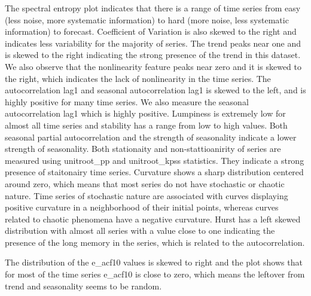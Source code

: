 \documentclass[preprint, 3p,
authoryear]{elsarticle} %
\begin{document}
The spectral entropy plot indicates that there is a range of time series
from easy (less noise, more systematic information) to hard (more noise,
less systematic information) to forecast. Coefficient of Variation is
also skewed to the right and indicates less variability for the majority
of series. The trend peaks near one and is skewed to the right
indicating the strong presence of the trend in this dataset. We also
observe that the nonlinearity feature peaks near zero and it is skewed
to the right, which indicates the lack of nonlinearity in the time
series. The autocorrelation lag1 and seasonal autocorrelation lag1 is
skewed to the left, and is highly positive for many time series. We also
measure the seasonal autocorrelation lag1 which is highly positive.
Lumpiness is extremely low for almost all time series and stability has
a range from low to high values. Both seasonal partial autocorrelation
and the strength of seasonality indicate a lower strength of
seasonality. Both stationaity and non-stattioanirity of series are
measured using unitroot\_pp and unitroot\_kpss statistics. They indicate
a strong presence of staitonairy time series. Curvature shows a sharp
distribution centered around zero, which means that most series do not
have stochastic or chaotic nature. Time series of stochastic nature are
associated with curves displaying positive curvature in a neighborhood
of their initial points, whereas curves related to chaotic phenomena
have a negative curvature. Hurst has a left skewed distribution with
almost all series with a value close to one indicating the presence of
the long memory in the series, which is related to the autocorrelation.

The distribution of the e\_acf10 values is skewed to right and the plot
shows that for most of the time series e\_acf10 is close to zero, which
means the leftover from trend and seasonality seems to be random.
\end{document}
